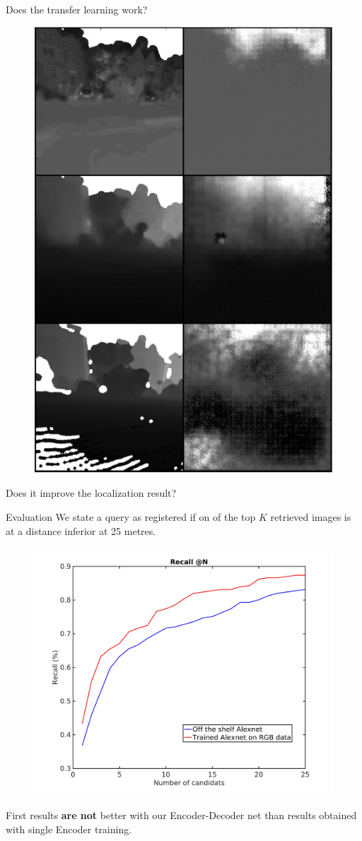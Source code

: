 \begin{frame}{Does the transfer learning work?}
\begin{minipage}[c]{0.24\linewidth}
\begin{figure}[c]
			\includegraphics[width=\linewidth]{images/mod5.png}			
		\end{figure}
	\end{minipage}
\end{frame}

\begin{frame}{Does it improve the localization result?}
	\begin{block}{Evaluation}
		We state a query as registered if on of the top $K$ retrieved images is at a distance inferior at 25 metres. 
	\end{block}
	\vfill
	\begin{figure}[c]
		\includegraphics[width=0.5\linewidth]{images/result.jpg}	
	\end{figure}
	\vfill
	First results \textbf{are not} better with our Encoder-Decoder net than results obtained with single Encoder training.
\end{frame}